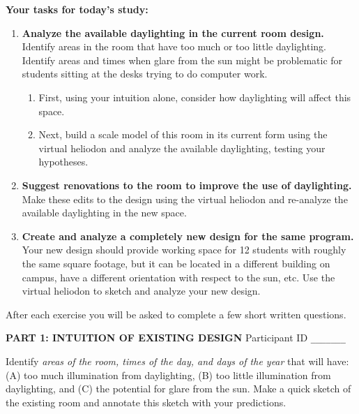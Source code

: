 \documentclass[12pt]{article}
\begin{document}
\vspace{0.4in}

{\bf Your tasks for today's study:}
\vspace{-0.1in}

\begin{enumerate}
\item {\bf Analyze the available daylighting in the current room
  design.}  Identify areas in the room that have too much or too
  little daylighting.  Identify areas and times when glare from the
  sun might be problematic for students sitting at the desks trying to
  do computer work.

  \begin{enumerate}

  \item First, using your intuition alone, consider how daylighting
    will affect this space.

  \item Next, build a scale model of this room in its current form
    using the virtual heliodon and analyze the available daylighting,
    testing your hypotheses.
    
  \end{enumerate}

\item {\bf Suggest renovations to the room to improve the use of
  daylighting.}  Make these edits to the design using the virtual
  heliodon and re-analyze the available daylighting in the new
  space.

\item {\bf Create and analyze a completely new design for the same
  program. } Your new design should provide working space for 12
  students with roughly the same square footage, but it can be located
  in a different building on campus, have a different orientation with
  respect to the sun, etc.  Use the virtual heliodon to sketch and
  analyze your new design.

\end{enumerate}

After each exercise you will be asked to complete a few short written
questions.


\newpage 
{\bf PART 1: INTUITION OF EXISTING DESIGN }
\hfill Participant ID \verb+_______+
\vspace{0.2in}

Identify {\em areas of the room, times of the day, and days of the
  year} that will have: (A) too much illumination from daylighting,
(B) too little illumination from daylighting, and (C) the potential
for glare from the sun.  Make a quick sketch of the existing room and
annotate this sketch with your predictions.
\end{document}
